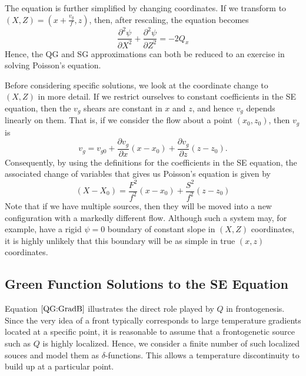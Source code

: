 \documentclass[11pt,onecolumn,oneside]{article}
\newcommand{\pdiff}[2]{\frac{\partial #1}{\partial #2}}
\begin{document}
The equation is further simplified by changing coordinates. If we transform to $(X,Z) = (x+\frac{v_g}{f},z)$, then, after rescaling, the equation becomes
\[
\pdiff{^2 \psi}{X^2} + \pdiff{^2 \psi}{Z^2} = -2 Q_x
\]
Hence, the QG and SG approximations can both be reduced to an exercise in solving Poisson's equation.

Before considering specific solutions, we look at the coordinate change to $(X,Z)$ in more detail. If we restrict ourselves to constant coefficients in the SE equation, then the $v_g$ shears are constant in $x$ and $z$, and hence $v_g$ depends linearly on them. That is, if we consider the flow about a point $(x_0,z_0)$, then $v_g$ is
\[
v_g = v_{g0} + \pdiff{v_g}{x} (x-x_0) + \pdiff{v_g}{z} (z-z_0).
\]
Consequently, by using the definitions for the coefficients in the SE equation, the associated change of variables that gives us Poisson's equation is given by
\[
(X-X_0) = \frac{F^2}{f^2} (x-x_0) + \frac{S^2}{f^2} (z-z_0)
\]
Note that if we have multiple sources, then they will be moved into a new configuration with a markedly different flow. Although such a system may, for example, have a rigid $\psi = 0$ boundary of constant slope in $(X,Z)$ coordinates, it is highly unlikely that this boundary will be as simple in true $(x,z)$ coordinates.



\subsection{Green Function Solutions to the SE Equation}

Equation $\eqref{QG:GradB}$ illustrates the direct role played by $Q$ in frontogenesis. Since the very idea of a front typically corresponds to large temperature gradients located at a specific point, it is reasonable to assume that a frontogenetic source such as $Q$ is highly localized. Hence, we consider a finite number of such localized souces and model them as $\delta$-functions. This allows a temperature discontinuity to build up at a particular point.
\end{document}

